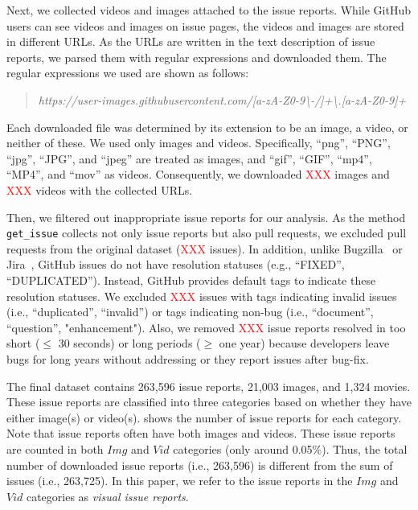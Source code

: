 Next, we collected videos and images attached to the issue reports. While GitHub users can see videos and images on issue pages, the videos and images are stored in different URLs. As the URLs are written in the text description of issue reports, we parsed them with regular expressions and downloaded them. The regular expressions we used are shown as follows:
\begin{quote}
\addtolength\leftmargini{0in}
{\it https://user-images.githubusercontent.com/[a-zA-Z0-9\textbackslash-/]+\textbackslash.[a-zA-Z0-9]+}
\end{quote}
Each downloaded file was determined by its extension to be an image, a video, or neither of these. We used only images and videos. Specifically, ``png'', ``PNG'', ``jpg'', ``JPG'', and ``jpeg'' are treated as images, and  ``gif'', ``GIF'', ``mp4'', ``MP4'', and ``mov'' as videos. 
Consequently, we downloaded \textcolor{red}{XXX} images and \textcolor{red}{XXX} videos with the collected URLs. 

Then, we filtered out inappropriate issue reports for our analysis. As the method \texttt{get\_issue} collects not only issue reports but also pull requests, we excluded pull requests from the original dataset (\textcolor{red}{XXX} issues).  
In addition, unlike Bugzilla~\citep{Bugzilla} or Jira~\citep{JIRA}, GitHub issues do not have resolution statuses (e.g., ``FIXED'', ``DUPLICATED''). 
Instead,  GitHub provides default tags to indicate these resolution statuses. 
We excluded \textcolor{red}{XXX} issues with tags indicating invalid issues (i.e., ``duplicated'', ``invalid'') or tags indicating non-bug (i.e., ``document'', ``question'', "enhancement"). Also, we removed \textcolor{red}{XXX} issue reports resolved in too short ($\leq$ 30 seconds) or long periods  ($\geq$ one year) because developers leave bugs for long years without addressing or they report issues after bug-fix. 


 The final dataset contains 263,596 issue reports,  21,003 images, and 1,324 movies. 
These issue reports are classified into three categories based on whether they have either image(s) or video(s). 
 shows the number of issue reports for each category. 
Note that issue reports often have both images and videos. 
These issue reports are counted in both $Img$ and $Vid$ categories (only around 0.05\%). 
Thus, the total number of downloaded issue reports (i.e., 263,596) is different from the sum of issues (i.e., 263,725). 
In this paper, we refer to the issue reports in the $Img$ and $Vid$ categories
as \textit{visual issue reports}. 

